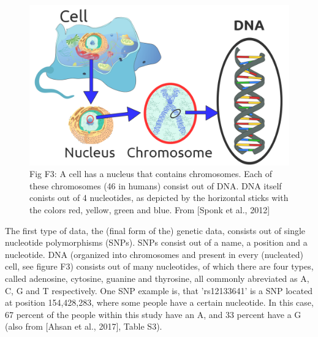 \begin{figure}[!htbp]
  \centering
  \includegraphics[width=\linewidth]{1189px-Eukaryote_DNA-en.png}
  \caption{
    Fig F3: A cell has a nucleus that contains chromosomes. 
    Each of these chromosomes (46 in humans) consist out of DNA. 
    DNA itself conists out of 4 nucleotides, 
    as depicted by the horizontal sticks 
    with the colors red, yellow, green and blue.
    From [Sponk et al., 2012]
  }
  \label{fig:eukakyote_dna}
\end{figure}

The first type of data, the (final form of the) genetic data,
consists out of single nucleotide polymorphisms (SNPs).
SNPs consist out of a name, a position and a nucleotide. 
DNA (organized into chromosomes and present in every (nucleated) cell, 
see figure F3) consists out of many nucleotides, of which there are four types,
called adenosine, cytosine, guanine and thyrosine, all commonly abreviated
as A, C, G and T respectively.
One SNP example is, that 'rs12133641' is a SNP located at position 154,428,283,
where some people have a certain nucleotide. In this case, 
67 percent of the people within this study have an A,
and 33 percent have a G (also from [Ahsan et al., 2017], Table S3).

